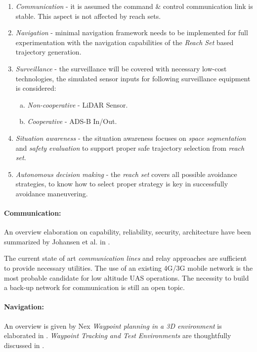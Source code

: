\begin{enumerate}
    \item \emph{Communication} - it is assumed the command \& control communication link is stable. This aspect is not affected by reach sets.
    
    \item \emph{Navigation} - minimal navigation framework needs to be implemented for full experimentation with the navigation capabilities of the \emph{Reach Set} based trajectory generation.
    
    \item \emph{Surveillance} - the surveillance will be covered with necessary low-cost technologies, the simulated sensor inputs for following surveillance equipment is considered:
    \begin{enumerate}[a.]
        \item \emph{Non-cooperative} - LiDAR Sensor.
        \item \emph{Cooperative} - ADS-B In/Out.
    \end{enumerate}
    
    \item \emph{Situation  awareness} - the situation awareness focuses on \emph{space segmentation} and \emph{safety evaluation} to support proper safe trajectory selection from \emph{reach set}.
    
    \item \emph{Autonomous decision making} - the \emph{reach set} covers all possible avoidance strategies, to know how to select proper strategy is key in successfully avoidance maneuvering.
\end{enumerate}

\paragraph{Communication:} An overview elaboration on capability, reliability, security, architecture have been summarized  by Johansen et al. in \cite{johansenetal2018surveyCommunicaiton}.

The current state of art \emph{communication lines} and relay approaches are sufficient to provide necessary utilities. The use of an existing 4G/3G mobile network is the most probable candidate for low altitude UAS operations. The necessity to build a back-up network for communication is still an open topic.

\paragraph{Navigation:} An overview is given by Nex \cite{nex2014uav} \emph{Waypoint planning in a 3D environment} is elaborated in \cite{bodin2007navigating}. \emph{Waypoint Tracking and Test Environments} are thoughtfully discussed in \cite{how2008real,girard2004border,andrade2017autonomous,klausen2017nonlinear}. 

